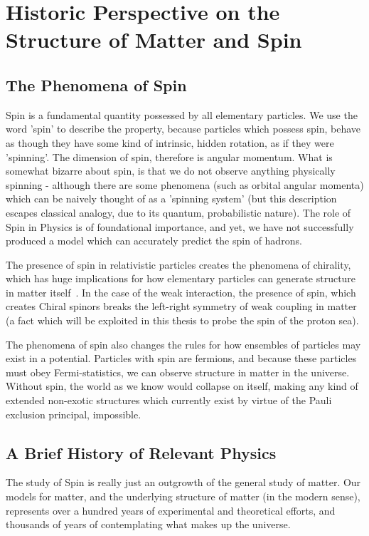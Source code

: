\chapter{Historic Perspective on the Structure of Matter and Spin}
\section{The Phenomena of Spin}

Spin is a fundamental quantity possessed by all elementary particles. We use
the word 'spin' to describe the property, because particles which possess spin,
behave as though they have some kind of intrinsic, hidden rotation, as if they
were 'spinning'. The dimension of spin, therefore is angular momentum. What is
somewhat bizarre about spin, is that we do not observe anything physically
spinning - although there are some phenomena (such as orbital angular momenta)
which can be naively thought of as a 'spinning system' (but this description
escapes classical analogy, due to its quantum, probabilistic nature). The role
of Spin in Physics is of foundational importance, and yet, we have not
successfully produced a model which can accurately predict the spin of hadrons.

The presence of spin in relativistic particles creates the phenomena of
chirality, which has huge implications for how elementary particles can generate
structure in matter itself~\cite{Brodsky1988}. In the case of the weak
interaction, the presence of spin, which creates Chiral spinors breaks the
left-right symmetry of weak coupling in matter (a fact which will be exploited
in this thesis to probe the spin of the proton sea).

The phenomena of spin also changes the rules for how ensembles of particles may
exist in a potential. Particles with spin are fermions, and because these
particles must obey Fermi-statistics, we can observe structure in matter in the
universe. Without spin, the world as we know would collapse on itself, making
any kind of extended non-exotic structures which currently exist by virtue of
the Pauli exclusion principal, impossible.

\clearpage
\section{A Brief History of Relevant Physics}

The study of Spin is really just an outgrowth of the general study of matter.
Our models for matter, and the underlying structure of matter (in the modern
sense), represents over a hundred years of experimental and theoretical efforts,
and thousands of years of contemplating what makes up the universe.

